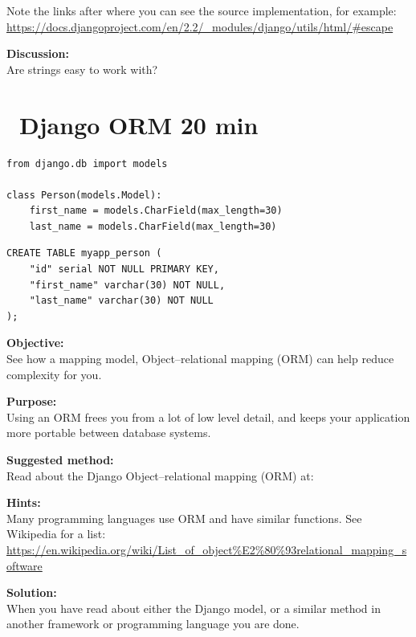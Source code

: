 \documentclass[a4paper,11pt,notitlepage]{report}
\begin{document}
Note the links after where you can see the source implementation, for example:\\
\url{https://docs.djangoproject.com/en/2.2/_modules/django/utils/html/#escape}


{\bf Discussion:}\\
Are strings easy to work with?


\chapter{\faExclamationTriangle\ Django ORM 20 min}
\label{ex:django-orm}

\begin{verbatim}
from django.db import models

class Person(models.Model):
    first_name = models.CharField(max_length=30)
    last_name = models.CharField(max_length=30)
\end{verbatim}

\begin{verbatim}
CREATE TABLE myapp_person (
    "id" serial NOT NULL PRIMARY KEY,
    "first_name" varchar(30) NOT NULL,
    "last_name" varchar(30) NOT NULL
);
\end{verbatim}

{\bf Objective:}\\
See how a mapping model, Object–relational mapping (ORM) can help reduce complexity for you.


{\bf Purpose:}\\
Using an ORM frees you from a lot of low level detail, and keeps your application more portable between database systems.


{\bf Suggested method:}\\
Read about the Django  Object–relational mapping (ORM) at:

\begin{list2}
\item {}
\item {}
\end{list2}

{\bf Hints:}\\
Many programming languages use ORM and have similar functions. See Wikipedia for a list:\\
\url{https://en.wikipedia.org/wiki/List_of_object%E2%80%93relational_mapping_software}

{\bf Solution:}\\
When you have read about either the Django model, or a similar method in another framework or programming language you are done.
\end{document}
